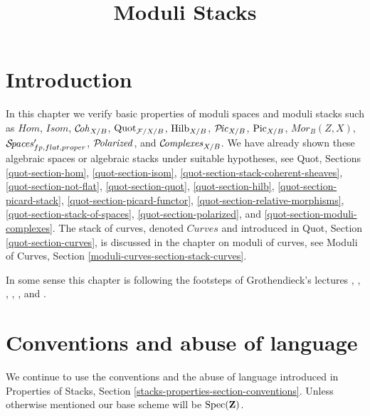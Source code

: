 

%


\title{Moduli Stacks}

\maketitle

\label{section-phantom}

\tableofcontents




\section{Introduction}
\label{section-introduction}

\noindent
In this chapter we verify basic properties of moduli spaces
and moduli stacks such as
$\mathit{Hom}$, $\mathit{Isom}$, $\mathcal{C}\!\mathit{oh}_{X/B}$,
$\mathrm{Quot}_{\mathcal{F}/X/B}$, $\mathrm{Hilb}_{X/B}$,
$\mathcal{P}\!\mathit{ic}_{X/B}$, $\mathrm{Pic}_{X/B}$, $\mathit{Mor}_B(Z, X)$,
$\mathcal{S}\!\mathit{paces}'_{fp, flat, proper}$, $\mathcal{P}\!\mathit{olarized}$, and
$\mathcal{C}\!\mathit{omplexes}_{X/B}$.
We have already shown these algebraic spaces or algebraic stacks
under suitable hypotheses, see Quot, Sections
\ref{quot-section-hom},
\ref{quot-section-isom},
\ref{quot-section-stack-coherent-sheaves},
\ref{quot-section-not-flat},
\ref{quot-section-quot},
\ref{quot-section-hilb},
\ref{quot-section-picard-stack},
\ref{quot-section-picard-functor},
\ref{quot-section-relative-morphisms},
\ref{quot-section-stack-of-spaces},
\ref{quot-section-polarized}, and
\ref{quot-section-moduli-complexes}.
The stack of curves, denoted $\textit{Curves}$ and introduced
in Quot, Section \ref{quot-section-curves}, is discussed in the
chapter on moduli of curves, see
Moduli of Curves, Section \ref{moduli-curves-section-stack-curves}.

\medskip\noindent
In some sense this chapter is following the footsteps of
Grothendieck's lectures \cite{Gr-I},
\cite{Gr-II},
\cite{Gr-III},
\cite{Gr-IV},
\cite{Gr-V}, and
\cite{Gr-VI}.







\section{Conventions and abuse of language}
\label{section-conventions}

\noindent
We continue to use the conventions and the abuse of language
introduced in
Properties of Stacks, Section \ref{stacks-properties-section-conventions}.
Unless otherwise mentioned our base scheme will be $\mathop{\mathrm{Spec}}(\mathbf{Z})$.






